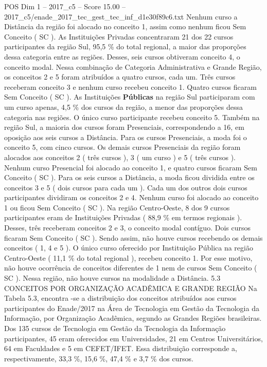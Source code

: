 \begin{textsample}{POS Dim 1 – 2017\_c5 – Score 15.00 – 2017\_c5/enade\_2017\_tec\_gest\_tec\_inf\_d1e30f89c6.txt}
Nenhum curso a Distância da região foi alocado no conceito 1, assim como nenhum ficou Sem Conceito ( SC ).
As Instituições Privadas concentraram 21 dos 22 cursos participantes da região Sul, 95,5 \% do total regional, a maior das proporções dessa categoria entre as regiões.
Desses, seis cursos obtiveram conceito 4, o conceito modal.
Nessa combinação de Categoria Administrativa e Grande Região, os conceitos 2 e 5 foram atribuídos a quatro cursos, cada um.
Três cursos receberam conceito 3 e nenhum curso recebeu conceito 1.
Quatro cursos ficaram Sem Conceito ( SC ).
As Instituições \textbf{Públicas} na região Sul participaram com um curso apenas, 4,5 \% dos cursos da região, a menor das proporções dessa categoria nas regiões.
O único curso participante recebeu conceito 5.
Também na região Sul, a maioria dos cursos foram Presenciais, correspondendo a 16, em oposição aos seis cursos a Distância.
Para os cursos Presenciais, a moda foi o conceito 5, com cinco cursos.
Os demais cursos Presenciais da região foram alocados aos conceitos 2 ( três cursos ), 3 ( um curso ) e 5 ( três cursos ).
Nenhum curso Presencial foi alocado ao conceito 1, e quatro cursos ficaram Sem Conceito ( SC ).
Para os seis cursos a Distância, a moda ficou dividida entre os conceitos 3 e 5 ( dois cursos para cada um ).
Cada um dos outros dois cursos participantes dividiram os conceitos 2 e 4.
Nenhum curso foi alocado ao conceito 1 ou ficou Sem Conceito ( SC ).
Na região Centro-Oeste, 8 dos 9 cursos participantes eram de Instituições Privadas ( 88,9 \% em termos regionais ).
Desses, três receberam conceitos 2 e 3, o conceito modal contíguo.
Dois cursos ficaram Sem Conceito ( SC ).
Sendo assim, não houve cursos recebendo os demais conceitos ( 1, 4 e 5 ).
O único curso oferecido por Instituição Pública na região Centro-Oeste ( 11,1 \% do total regional ), recebeu conceito 1.
Por esse motivo, não houve ocorrência de conceitos diferentes de 1 nem de cursos Sem Conceito ( SC ).
Nessa região, não houve cursos na modalidade a Distância. 5.3 CONCEITOS POR ORGANIZAÇÃO ACADÊMICA E GRANDE REGIÃO Na Tabela 5.3, encontra -se a distribuição dos conceitos atribuídos aos cursos participantes do Enade/2017 na Área de Tecnologia em Gestão da Tecnologia da Informação, por Organização Acadêmica, segundo as Grandes Regiões brasileiras.
Dos 135 cursos de Tecnologia em Gestão da Tecnologia da Informação participantes, 45 eram oferecidos em Universidades, 21 em Centros Universitários, 64 em Faculdades e 5 em CEFET/IFET.
Essa distribuição corresponde a, respectivamente, 33,3 \%, 15,6 \%, 47,4 \% e 3,7 \% dos cursos.

\end{textsample}

